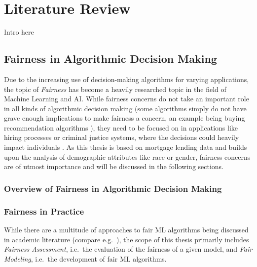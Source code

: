 \chapter{Literature Review}\label{chap:lit}

Intro here

\section{Fairness in Algorithmic Decision Making}\label{sec:fairness}

Due to the increasing use of decision-making algorithms for varying applications, the topic of \textit{Fairness} has become a heavily researched topic in the field of Machine Learning and AI.\@
While fairness concerns do not take an important role in all kinds of algorithmic decision making (some algorithms simply do not have grave enough implications to make fairness a concern, an example being buying recommendation algorithms \parencite{Marcinkevics2023}), 
they need to be focused on in applications like hiring processes or criminal justice systems, where the decisions could heavily impact individuals \parencite{Barocas2016}.
As this thesis is based on mortgage lending data and builds upon the analysis of demographic attributes like race or gender, fairness concerns are of utmost importance and will be discussed in the following sections.

\subsection{Overview of Fairness in Algorithmic Decision Making}\label{subsec:overview}


\subsection{Fairness in Practice}\label{subsec:practice}

While there are a multitude of approaches to fair ML algorithms being discussed in academic literature (compare e.g.\ \cite{Mehrabi2021}), the scope of this thesis primarily includes \textit{Fairness Assessment}, i.e.\ the evaluation of the fairness of a given model, and \textit{Fair Modeling}, i.e.\ the development of fair ML algorithms.

